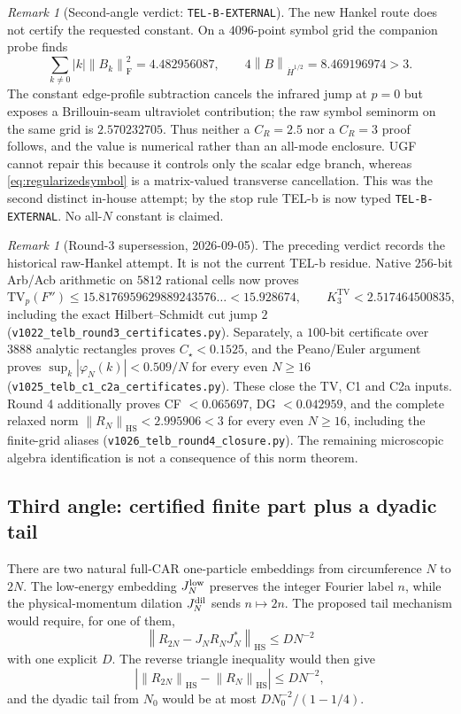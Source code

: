 \documentclass[11pt]{article}
\theoremstyle{remark}
\newtheorem{remark}[theorem]{Remark}
\newcommand{\HS}{\mathrm{HS}}
\newcommand{\norm}[1]{\left\lVert#1\right\rVert}
\begin{document}
\begin{remark}[Second-angle verdict: \texttt{TEL-B-EXTERNAL}]
The new Hankel route does not certify the requested constant.  On a
$4096$-point symbol grid the companion probe finds
\[
 \sum_{k\ne0}|k|\norm{B_k}_{\mathrm F}^2
 =4.482956087,\qquad
 4\norm{B}_{\dot H^{1/2}}=8.469196974>3.
\]
The constant edge-profile subtraction cancels the infrared jump at
$p=0$ but exposes a Brillouin-seam ultraviolet contribution; the raw
symbol seminorm on the same grid is $2.570232705$.  Thus neither a
$C_R=2.5$ nor a $C_R=3$ proof follows, and the value is numerical rather
than an all-mode enclosure.  UGF cannot repair this because it controls
only the scalar edge branch, whereas \eqref{eq:regularizedsymbol} is a
matrix-valued transverse cancellation.  This was the second distinct
in-house attempt; by the stop rule TEL-b is now typed
\texttt{TEL-B-EXTERNAL}.  No all-$N$ constant is claimed.
\end{remark}

\begin{remark}[Round-3 supersession, 2026-09-05]
The preceding verdict records the historical raw-Hankel attempt.  It is not the
current TEL-b residue.  Native $256$-bit Arb/Acb arithmetic on $5812$ rational
cells now proves
\[
 \mathrm{TV}_p(F'')\le15.8176959629889243576\ldots<15.928674,
 \qquad K_3^{\mathrm{TV}}<2.517464500835,
\]
including the exact Hilbert--Schmidt cut jump $2$
(\texttt{v1022\_telb\_round3\_certificates.py}).  Separately, a $100$-bit
certificate over $3888$ analytic rectangles proves
$C_\star<0.1525$, and the Peano/Euler argument proves
$\sup_k|\varphi_N(k)|<0.509/N$ for every even $N\ge16$
(\texttt{v1025\_telb\_c1\_c2a\_certificates.py}).  These close the TV, C1 and
C2a inputs. Round 4 additionally proves CF $<0.065697$, DG $<0.042959$,
and the complete relaxed norm $\norm{R_N}_{\HS}<2.995906<3$ for every even
$N\ge16$, including the finite-grid aliases
(\texttt{v1026\_telb\_round4\_closure.py}). The remaining microscopic
algebra identification is not a consequence of this norm theorem.
\end{remark}

\subsection{Third angle: certified finite part plus a dyadic tail}

There are two natural full-CAR one-particle embeddings from circumference
$N$ to $2N$.  The low-energy embedding $J_N^{\rm low}$ preserves the
integer Fourier label $n$, while the physical-momentum dilation
$J_N^{\rm dil}$ sends $n\mapsto2n$.  The proposed tail mechanism would
require, for one of them,
\[
 \norm{R_{2N}-J_NR_NJ_N^*}_{\HS}\le DN^{-2}
\tag{5.21}\label{eq:Rtailproposed}
\]
with one explicit $D$.  The reverse triangle inequality would then give
\[
 \left|\norm{R_{2N}}_{\HS}-\norm{R_N}_{\HS}\right|
 \le DN^{-2},
\tag{5.22}\label{eq:Rnormtail}
\]
and the dyadic tail from $N_0$ would be at most
$DN_0^{-2}/(1-1/4)$.
\end{document}
